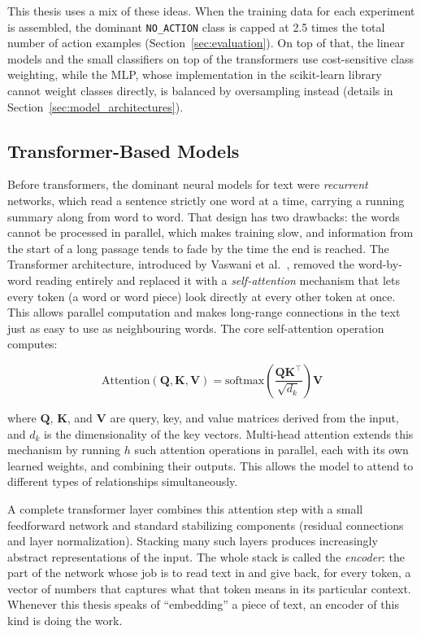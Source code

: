 This thesis uses a mix of these ideas. When the training data for each experiment is assembled, the dominant \texttt{NO\_ACTION} class is capped at 2.5 times the total number of action examples (Section~\ref{sec:evaluation}). On top of that, the linear models and the small classifiers on top of the transformers use cost-sensitive class weighting, while the MLP, whose implementation in the scikit-learn library cannot weight classes directly, is balanced by oversampling instead (details in Section~\ref{sec:model_architectures}).

\subsection{Transformer-Based Models}
\label{sec:transformers}

Before transformers, the dominant neural models for text were \emph{recurrent} networks, which read a sentence strictly one word at a time, carrying a running summary along from word to word. That design has two drawbacks: the words cannot be processed in parallel, which makes training slow, and information from the start of a long passage tends to fade by the time the end is reached. The Transformer architecture, introduced by Vaswani et al.~\cite{vaswani2017attention}, removed the word-by-word reading entirely and replaced it with a \emph{self-attention} mechanism that lets every token (a word or word piece) look directly at every other token at once. This allows parallel computation and makes long-range connections in the text just as easy to use as neighbouring words. The core self-attention operation computes:

\begin{equation}
\text{Attention}(\mathbf{Q}, \mathbf{K}, \mathbf{V}) = \text{softmax}\!\left(\frac{\mathbf{Q}\mathbf{K}^\top}{\sqrt{d_k}}\right)\mathbf{V}
\label{eq:attention}
\end{equation}

\noindent where $\mathbf{Q}$, $\mathbf{K}$, and $\mathbf{V}$ are query, key, and value matrices derived from the input, and $d_k$ is the dimensionality of the key vectors. Multi-head attention extends this mechanism by running $h$ such attention operations in parallel, each with its own learned weights, and combining their outputs. This allows the model to attend to different types of relationships simultaneously.

A complete transformer layer combines this attention step with a small feedforward network and standard stabilizing components (residual connections and layer normalization). Stacking many such layers produces increasingly abstract representations of the input. The whole stack is called the \emph{encoder}: the part of the network whose job is to read text in and give back, for every token, a vector of numbers that captures what that token means in its particular context. Whenever this thesis speaks of ``embedding'' a piece of text, an encoder of this kind is doing the work.

